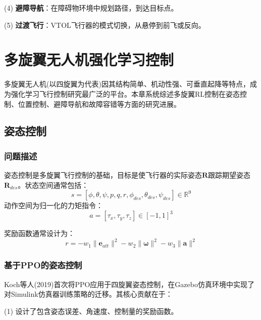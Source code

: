\documentclass[12pt,a4paper]{ctexart}
\begin{document}
(4) \textbf{避障导航}：在障碍物环境中规划路径，到达目标点。

(5) \textbf{过渡飞行}：VTOL飞行器的模式切换，从悬停到前飞或反向。

\section{多旋翼无人机强化学习控制}\label{sec:multirotor}

多旋翼无人机(以四旋翼为代表)因其结构简单、机动性强、可垂直起降等特点，成为强化学习飞行控制研究最广泛的平台。本章系统综述多旋翼RL控制在姿态控制、位置控制、避障导航和故障容错等方面的研究进展。

\subsection{姿态控制}

\subsubsection{问题描述}

姿态控制是多旋翼飞行控制的基础，目标是使飞行器的实际姿态$\mathbf{R}$跟踪期望姿态$\mathbf{R}_{des}$。状态空间通常包括：
\begin{equation}
    s = [\phi, \theta, \psi, p, q, r, \phi_{des}, \theta_{des}, \psi_{des}] \in \mathbb{R}^9
\end{equation}
动作空间为归一化的力矩指令：
\begin{equation}
    a = [\tau_x, \tau_y, \tau_z] \in [-1, 1]^3
\end{equation}

奖励函数通常设计为：
\begin{equation}
    r = -w_1 \|\mathbf{e}_{att}\|^2 - w_2 \|\boldsymbol{\omega}\|^2 - w_3 \|\mathbf{a}\|^2
\end{equation}

\subsubsection{基于PPO的姿态控制}

Koch等人(2019)首次将PPO应用于四旋翼姿态控制，在Gazebo仿真环境中实现了对Simulink仿真器训练策略的迁移。其核心贡献在于：

(1) 设计了包含姿态误差、角速度、控制量的奖励函数。
\end{document}
